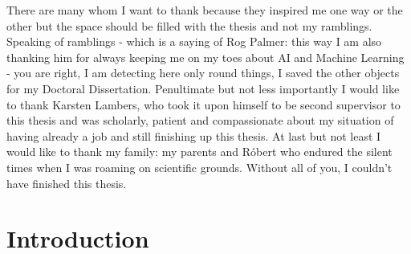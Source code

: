\documentclass[
  12pt,
]{article}
\begin{document}
\newline
There are many whom I want to thank because they inspired me one way or the other but the space should be filled with the thesis and not my ramblings. Speaking of ramblings - which is a saying of Rog Palmer: this way I am also thanking him for always keeping me on my toes about AI and Machine Learning - you are right, I am detecting here only round things, I saved the other objects for my Doctoral Dissertation.
\newline
Penultimate but not less importantly I would like to thank Karsten Lambers, who took it upon himself to be second supervisor to this thesis and was scholarly, patient and compassionate about my situation of having already a job and still finishing up this thesis.
\newline
At last but not least I would like to thank my family: my parents and Róbert who endured the silent times when I was roaming on scientific grounds.
\newline
Without all of you, I couldn't have finished this thesis.

\newpage
{}

\vspace{5mm}
\justifying

\hypertarget{introduction}{%
\section{Introduction}\label{introduction}}
\end{document}
